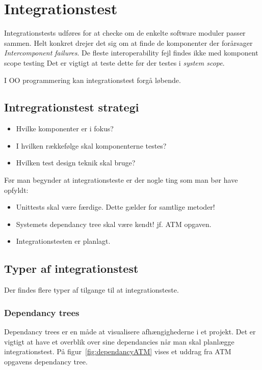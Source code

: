\section{Integrationstest}
Integrationstests udføres for at checke om de enkelte software moduler passer sammen. Helt konkret drejer det sig om at finde de komponenter der forårsager \textit{Intercomponent failures}. De fleste interoperability fejl findes ikke med komponent scope testing Det er vigtigt at teste dette før der testes i \textit{system scope}.

I OO programmering kan integrationstest forgå løbende.

\subsection{Intregrationstest strategi}

\begin{itemize}
	\item Hvilke komponenter er i fokus?
	\item I hvilken rækkefølge skal komponenterne testes?
	\item Hvilken test design teknik skal bruge?
\end{itemize}

Før man begynder at integrationsteste er der nogle ting som man bør have opfyldt:
\begin{itemize}
	\item Unittests skal være færdige. Dette gælder for samtlige metoder!
	\item Systemets dependancy tree skal være kendt! jf. ATM opgaven.
	\item Integrationstesten er planlagt.
\end{itemize}

\subsection{Typer af integrationstest}
Der findes flere typer af tilgange til at integrationsteste.

\subsubsection{Dependancy trees}
Dependancy trees er en måde at visualisere afhængighederne i et projekt. Det er vigtigt at have et overblik over sine dependancies når man skal planlægge integrationstest. På figur~\ref{fig:dependancyATM} vises et uddrag fra ATM opgavens dependancy tree.

